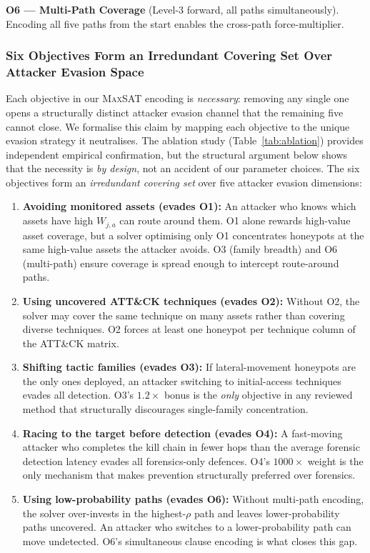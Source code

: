 \documentclass[journal]{IEEEtran}
\newcommand{\maxsat}{\textsc{MaxSAT}}
\begin{document}
\noindent\textbf{O6 --- Multi-Path Coverage}
(Level-3 forward, all paths simultaneously).
Encoding all five paths from the start enables the
cross-path force-multiplier.

\subsubsection{Six Objectives Form an Irredundant Covering Set
               Over Attacker Evasion Space}
\label{subsubsec:whysix}

Each objective in our \maxsat{} encoding is \emph{necessary}:
removing any single one opens a structurally distinct
attacker evasion channel that the remaining five cannot
close.
We formalise this claim by mapping each objective to the
unique evasion strategy it neutralises.
The ablation study (Table~\ref{tab:ablation}) provides
independent empirical confirmation, but the structural
argument below shows that the necessity is \emph{by design},
not an accident of our parameter choices.
The six objectives form an \emph{irredundant covering set}
over five attacker evasion dimensions:

\begin{enumerate}
\item \textbf{Avoiding monitored assets (evades O1):}
An attacker who knows which assets have high $W_{j,a}$ can
route around them.
O1 alone rewards high-value asset coverage, but a solver
optimising only O1 concentrates honeypots at the same
high-value assets the attacker avoids.
O3 (family breadth) and O6 (multi-path) ensure coverage
is spread enough to intercept route-around paths.

\item \textbf{Using uncovered ATT\&CK techniques (evades O2):}
Without O2, the solver may cover the same technique on
many assets rather than covering diverse techniques.
O2 forces at least one honeypot per technique column of
the ATT\&CK matrix.

\item \textbf{Shifting tactic families (evades O3):}
If lateral-movement honeypots are the only ones deployed,
an attacker switching to initial-access techniques evades
all detection.
O3's $1.2\times$ bonus is the \emph{only} objective in
any reviewed method that structurally discourages
single-family concentration.

\item \textbf{Racing to the target before detection (evades O4):}
A fast-moving attacker who completes the kill chain in
fewer hops than the average forensic detection latency
evades all forensics-only defences.
O4's $1000\times$ weight is the only mechanism that
makes prevention structurally preferred over forensics.

\item \textbf{Using low-probability paths (evades O6):}
Without multi-path encoding, the solver over-invests in
the highest-$\rho$ path and leaves lower-probability
paths uncovered.
An attacker who switches to a lower-probability path can
move undetected.
O6's simultaneous clause encoding is what closes this gap.
\end{enumerate}
\end{document}
